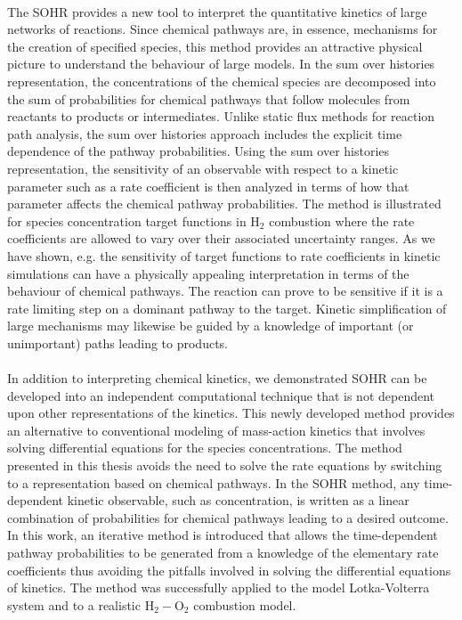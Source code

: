 \paragraph{}
The SOHR provides a new tool to interpret the quantitative kinetics of large networks
of reactions. Since chemical pathways are, in essence, mechanisms for the creation
of specified species, this method provides an attractive physical picture to
understand the behaviour of large models. In the sum over histories representation, the concentrations of the chemical species are
decomposed into the sum of probabilities for chemical pathways that follow
molecules from reactants to products or intermediates. Unlike static flux
methods for reaction path analysis, the sum over histories approach includes the
explicit time dependence of the pathway probabilities. Using the sum over
histories representation, the sensitivity of an observable with respect to a kinetic
parameter such as a rate coefficient is then analyzed in terms of how that
parameter affects the chemical pathway probabilities. The method is illustrated
for species concentration target functions in H$_2$ combustion where the rate
coefficients are allowed to vary over their associated uncertainty ranges. As we have shown, e.g. the sensitivity of
target functions to rate coefficients in kinetic simulations can have a physically appealing
interpretation in terms of the behaviour of chemical pathways. The reaction can
prove to be sensitive if it is a rate limiting step on a dominant pathway to the target.
Kinetic simplification\cite{ch1_IRPC_67_skodje2001geometrical,ch1_IRPC_68_law2003development,ch1_IRPC_69_maas1992simplifying} of large mechanisms may likewise be guided by a
knowledge of important (or unimportant) paths leading to products.
\newline
\paragraph{}
In addition to interpreting chemical kinetics, we demonstrated SOHR can be developed into an
independent computational technique that is not dependent upon other representations 
of the kinetics. This newly developed method provides an alternative to conventional modeling of mass-action kinetics that involves solving differential equations for the species concentrations.  The method presented in this thesis avoids the need to solve the rate equations by switching to a representation based on chemical pathways.  In the SOHR method, any time-dependent kinetic observable, such as concentration, is written as a linear combination of probabilities for chemical pathways leading to a desired outcome.  In this work, an iterative method is introduced that allows the time-dependent pathway probabilities to be generated from a knowledge of the elementary rate coefficients thus avoiding the pitfalls involved in solving the differential equations of kinetics.  The method was successfully applied to the model Lotka-Volterra system and to a realistic H$_2-$O$_2$ combustion model.